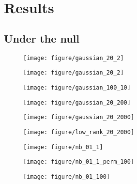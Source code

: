 \documentclass{article}
\begin{document}
\section{Results}

\subsection{Under the null}

\begin{figure}[ht]
  \centering
  \texttt{[image: figure/gaussian\_20\_2]}
  \caption{\label{fig:label} }
\end{figure}

\begin{figure}[ht]
  \centering
  \texttt{[image: figure/gaussian\_20\_2]}
  \caption{\label{fig:label} }
\end{figure}

\begin{figure}[ht]
  \centering
  \texttt{[image: figure/gaussian\_100\_10]}
  \caption{\label{fig:label} }
\end{figure}


\begin{figure}[ht]
  \centering
  \texttt{[image: figure/gaussian\_20\_200]}
  \caption{\label{fig:label} }
\end{figure}

\begin{figure}[ht]
  \centering
  \texttt{[image: figure/gaussian\_20\_2000]}
  \caption{\label{fig:label} }
\end{figure}

\begin{figure}[ht]
  \centering
  \texttt{[image: figure/low\_rank\_20\_2000]}
  \caption{\label{fig:label} }
\end{figure}

\begin{figure}[ht]
  \centering
  \texttt{[image: figure/nb\_01\_1]}
  \caption{\label{fig:label} }
\end{figure}

\begin{figure}[ht]
  \centering
  \texttt{[image: figure/nb\_01\_1\_perm\_100]}
  \caption{\label{fig:label} }
\end{figure}

\begin{figure}[ht]
  \centering
  \texttt{[image: figure/nb\_01\_100]}
  \caption{\label{fig:label} }
\end{figure}
\end{document}
